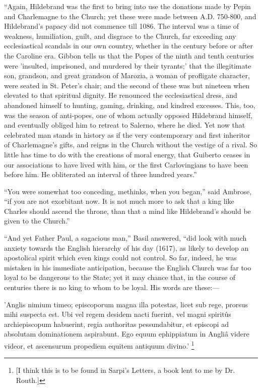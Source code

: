 ``Again, Hildebrand was the first to bring into
use the donations made by Pepin and Charlemagne to the Church; yet
these were made between A.D. 750-800, and Hildebrand's papacy did not
commence till 1086. The interval was a time of weakness, humiliation,
guilt, and disgrace to the Church, far exceeding any ecclesiastical
scandals in our own country, whether in the century before or after
the Caroline era. Gibbon tells us that the Popes of the ninth and
tenth centuries were 'insulted, imprisoned, and murdered by their
tyrants;' that the illegitimate son, grandson, and great grandson of
Marozia, a woman of profligate character, were seated in St. Peter's
chair; and the second of these was but nineteen when elevated to that
spiritual dignity. He renounced the ecclesiastical dress, and
abandoned himself to hunting, gaming, drinking, and kindred excesses.
This, too, was the season of anti-popes, one of whom actually opposed
Hildebrand himself, and eventually obliged him to retreat to Salerno,
where he died. Yet now that celebrated man stands in history as if the
very contemporary and first inheritor of Charlemagne's gifts, and
reigns in the Church without the vestige of a rival. So little has
time to do with the creations of moral energy, that Guiberto ceases in
our associations to have lived with him, or the first Carlovingians to
have been before him. He obliterated an interval of three hundred
years.''

``You were somewhat too conceding, methinks, when
you began,'' said Ambrose, ``if you are not exorbitant now. It is not
much more to ask that a king like Charles should ascend the throne,
than that a mind like Hildebrand's should be given to the Church.''

``And yet Father Paul, a sagacious man,'' Basil
answered, ``did look with much anxiety towards the English hierarchy of
his day (1617), as likely to develop an apostolical spirit which
even kings could not control. So far, indeed, he was mistaken in his
immediate anticipation, because the English Church was far too loyal
to be dangerous to the State; yet it may chance that, in the course of
centuries there is no king to whom to be loyal. His words are
these:—

'Anglis nimium
timeo; episcoporum magna illa potestas, licet sub rege, prorsus mihi
suspecta est. Ubi vel regem desidem nacti fuerint, vel magni spiritûs
archiepiscopum habuerint, regia authoritas pessundabitur, et episcopi
ad absolutam dominationem aspirabunt. Ego equum ephippiatum in Angliâ
videre videor, et ascensurum propediem equitem antiquum divino.'
\footnote{[I think this is to be found in Sarpi's
Letters, a book lent to me by Dr. Routh.]}

